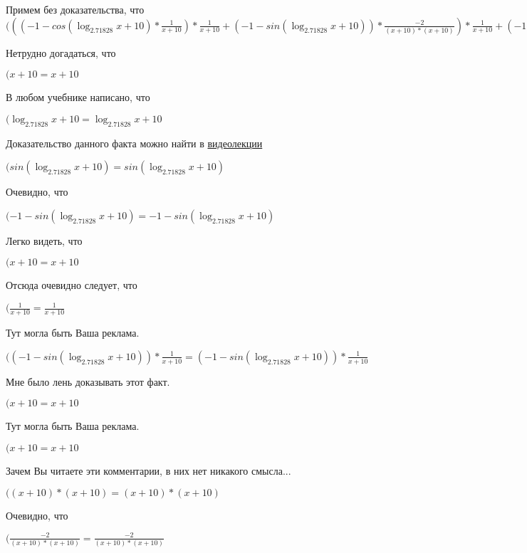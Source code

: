 \documentclass[12pt,a4paper,fleqn]{article}
\theoremstyle{definition}
\begin{document}
Примем без доказательства, что
$((( -1  - cos(\log_{ 2.71828 }{ x  +  10 }) * \frac{ 1 }{ x  +  10 }
) * \frac{ 1 }{ x  +  10 }
 + ( -1  - sin(\log_{ 2.71828 }{ x  +  10 })) * \frac{ -2 }{( x  +  10 ) * ( x  +  10 )}
) * \frac{ 1 }{ x  +  10 }
 + ( -1  - sin(\log_{ 2.71828 }{ x  +  10 })) * \frac{ 1 }{ x  +  10 }
 * \frac{ -2 }{( x  +  10 ) * ( x  +  10 )}
 = (( -1  - cos(\log_{ 2.71828 }{ x  +  10 }) * \frac{ 1 }{ x  +  10 }
) * \frac{ 1 }{ x  +  10 }
 + ( -1  - sin(\log_{ 2.71828 }{ x  +  10 })) * \frac{ -2 }{( x  +  10 ) * ( x  +  10 )}
) * \frac{ 1 }{ x  +  10 }
 + ( -1  - sin(\log_{ 2.71828 }{ x  +  10 })) * \frac{ 1 }{ x  +  10 }
 * \frac{ -2 }{( x  +  10 ) * ( x  +  10 )}
$

Нетрудно догадаться, что

$( x  +  10  =  x  +  10 $

В любом учебнике написано, что

$(\log_{ 2.71828 }{ x  +  10 } = \log_{ 2.71828 }{ x  +  10 }$

Доказательство данного факта можно найти в \href{https://www.youtube.com/watch?v=dQw4w9WgXcQ}{видеолекции}

$(sin(\log_{ 2.71828 }{ x  +  10 }) = sin(\log_{ 2.71828 }{ x  +  10 })$

Очевидно, что

$( -1  - sin(\log_{ 2.71828 }{ x  +  10 }) =  -1  - sin(\log_{ 2.71828 }{ x  +  10 })$

Легко видеть, что

$( x  +  10  =  x  +  10 $

Отсюда очевидно следует, что

$(\frac{ 1 }{ x  +  10 }
 = \frac{ 1 }{ x  +  10 }
$

Тут могла быть Ваша реклама.

$(( -1  - sin(\log_{ 2.71828 }{ x  +  10 })) * \frac{ 1 }{ x  +  10 }
 = ( -1  - sin(\log_{ 2.71828 }{ x  +  10 })) * \frac{ 1 }{ x  +  10 }
$

Мне было лень доказывать этот факт.

$( x  +  10  =  x  +  10 $

Тут могла быть Ваша реклама.

$( x  +  10  =  x  +  10 $

Зачем Вы читаете эти комментарии, в них нет никакого смысла...

$(( x  +  10 ) * ( x  +  10 ) = ( x  +  10 ) * ( x  +  10 )$

Очевидно, что

$(\frac{ -2 }{( x  +  10 ) * ( x  +  10 )}
 = \frac{ -2 }{( x  +  10 ) * ( x  +  10 )}
$
\end{document}
